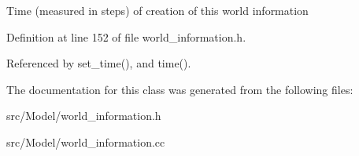 Time (measured in steps) of creation of this world information 

Definition at line 152 of file world\_\-information.h.

Referenced by set\_\-time(), and time().

The documentation for this class was generated from the following files:\begin{CompactItemize}
\item 
src/Model/world\_\-information.h\item 
src/Model/world\_\-information.cc\end{CompactItemize}
